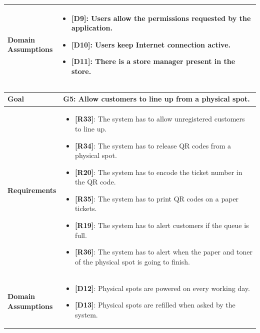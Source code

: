 \begin{table}[H]
\begin{tabular}{| m{} | m{} |}
        \hline
        \shortstack[l]{\textbf{Domain} \\ \textbf{Assumptions}} &
        \begin{itemize}
            \item {\textbf{[D9]}}: Users allow the permissions requested by the application.
            \item {\textbf{[D10]}}: Users keep Internet connection active.
            \item {\textbf{[D11]}}: There is a store manager present in the store.
        \end{itemize} \\
        \hline
    \end{tabular}
\end{table}

\begin{table}[H]
    \centering
    \begin{tabular}{| m{} | m{} |}
        \hline
        \textbf{Goal} &
        \textbf{G5: Allow customers to line up from a physical spot.} \\
        \hline
        \textbf{Requirements} &
        \begin{itemize}
            \item {\textbf{[R33]}}: The system has to allow unregistered customers to line up.
            \item {\textbf{[R34]}}: The system has to release QR codes from a physical spot.
            \item {\textbf{[R20]}}: The system has to encode the ticket number in the QR code.
            \item {\textbf{[R35]}}: The system has to print QR codes on a paper tickets.
            \item {\textbf{[R19]}}: The system has to alert customers if the queue is full.
            \item {\textbf{[R36]}}: The system has to alert when the paper and toner of the physical spot is going to finish.
        \end{itemize} \\
        \hline
        \shortstack[l]{\textbf{Domain} \\ \textbf{Assumptions}} &
        \begin{itemize}
            \item {\textbf{[D12]}}: Physical spots are powered on every working day.
            \item {\textbf{[D13]}}: Physical spots are refilled when asked by the system.
        \end{itemize} \\
        \hline
    \end{tabular}
\end{table}

